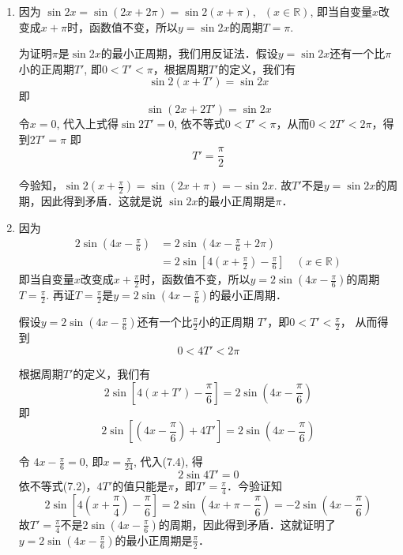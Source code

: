 \begin{solution}
\begin{enumerate}
\item
    因为 $\sin2x =\sin(2x+2\pi)=\sin 2(x+\pi), \;\; (x\in\mathbb{R})$, 即当自变量$x$改变成$x+\pi$时，函数值不变，所以$y=\sin2x$的周期$T=\pi$.

为证明$\pi$是$\sin2x$的最小正周期，我们用反证法．假设$y=\sin2x$还有一个比$\pi$小的正周期$T'$, 即$0<T'<\pi$，根据周期$T'$的定义，我们有
\[\sin2 (x+T') =\sin2x\]
即
$$\sin (2x+2T') =\sin2x$$
令$x=0$, 代入上式得$\sin 2T'=0$,
依不等式$0<T'<\pi$，从而$0<2T'<2\pi$，得到$2T'=\pi$
即
\[T'=\frac{\pi}{2}\]

今验知，$\sin2\left(x+\frac{\pi}{2}\right)=\sin(2x+\pi)=-\sin2x$. 故$T'$不是$y=\sin2x$的周期，因此得到矛盾．这就是说 $\sin 2x$的最小正周期是$\pi$．



\item 因为
\[\begin{split}
    2\sin\left(4x-\frac{\pi}{6}\right)&=2\sin\left(4x-\frac{\pi}{6}+2\pi\right)\\
    &=2\sin\left[4\left(x+\frac{\pi}{2}\right)-\frac{\pi}{6}\right]\quad (x\in\mathbb{R})
\end{split}\]
即当自变量$x$改变成$x+\frac{\pi}{2}$时，函数值不变，所以$y=
2\sin\left(4x-\frac{\pi}{6}\right)$的周期$T=\frac{\pi}{2}$. 再证$T=\frac{\pi}{2}$是$y=2\sin\left(4x-\frac{\pi}{6}\right)$的最小正周期．

假设$y=2\sin\left(4x-\frac{\pi}{6}\right)$还有一个比$\frac{\pi}{2}$小的正周期
$T'$，即$0<T'<\frac{\pi}{2}$，
从而得到
\begin{equation}
    0<4T'<2\pi
\end{equation}

根据周期$T'$的定义，我们有
\begin{equation}
    2\sin \left[4(x+T')-\frac{\pi}{6}\right]=2\sin \left(4x-\frac{\pi}{6}\right)
\end{equation}
即
\begin{equation}
    2\sin \left[\left(4x-\frac{\pi}{6}\right)+4T'\right]=2\sin \left(4x-\frac{\pi}{6}\right)
\end{equation}

令 $4x-\frac{\pi}{6}=0$, 即$x=\frac{\pi}{24}$, 代入(7.4), 得
$$2\sin 4T'=0$$
依不等式(7.2)，$4T'$的值只能是$\pi$，即$T'=\frac{\pi}{4}$．今验证知
\[2\sin\left[4\left(x+\frac{\pi}{4}\right)-\frac{\pi}{6}\right]=2\sin \left(4x+\pi-\frac{\pi}{6}\right)=-2\sin\left(4x-\frac{\pi}{6}\right)\]
故$T'=\frac{\pi}{4}$不是$2\sin\left(4x-\frac{\pi}{6}\right)$的周期，因此得到矛盾．这就证明了$y=2\sin\left(4x-\frac{\pi}{6}\right)$的最小正周期是$\frac{\pi}{2}$．
\end{enumerate}
\end{solution}

